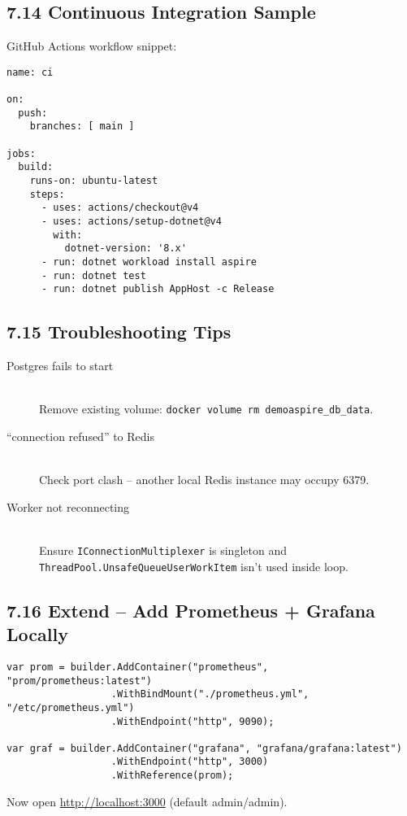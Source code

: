 \documentclass[table]{article}
\begin{document}
\subsection*{7.14 \faSync\enspace Continuous Integration Sample}
GitHub Actions workflow snippet:

\begin{verbatim}
name: ci

on:
  push:
    branches: [ main ]

jobs:
  build:
    runs-on: ubuntu-latest
    steps:
      - uses: actions/checkout@v4
      - uses: actions/setup-dotnet@v4
        with:
          dotnet-version: '8.x'
      - run: dotnet workload install aspire
      - run: dotnet test
      - run: dotnet publish AppHost -c Release
\end{verbatim}

\subsection*{7.15 \faHandsHelping\enspace Troubleshooting Tips}
\begin{description}
  \item[\faExclamationTriangle Postgres fails to start]\hfill\\
        Remove existing volume:  
\verb|docker volume rm demoaspire_db_data|.
  \item[\faExclamationTriangle “connection refused” to Redis]\hfill\\
        Check port clash – another local Redis instance may occupy 6379.
  \item[\faExclamationTriangle Worker not reconnecting]\hfill\\
        Ensure \verb|IConnectionMultiplexer| is singleton and
        \verb|ThreadPool.UnsafeQueueUserWorkItem| isn’t used inside loop.
\end{description}

\subsection*{7.16 \faChartBar\enspace Extend – Add Prometheus + Grafana Locally}
\begin{verbatim}
var prom = builder.AddContainer("prometheus", "prom/prometheus:latest")
                  .WithBindMount("./prometheus.yml", "/etc/prometheus.yml")
                  .WithEndpoint("http", 9090);

var graf = builder.AddContainer("grafana", "grafana/grafana:latest")
                  .WithEndpoint("http", 3000)
                  .WithReference(prom);
\end{verbatim}
Now open \url{http://localhost:3000} (default admin/admin).
\end{document}
